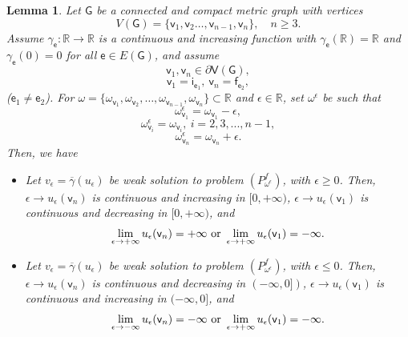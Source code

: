 \documentclass[reqno,12pt]{amsart}
\newtheorem{lemma}[theorem]{Lemma} %
\def\R{\mathbb R} %
\def\e{\mathsf{e}} 	%
\def\v{\mathsf{v}}	%
\newcommand{\vi}{\mathsf{i}} %
\newcommand{\vf}{\mathsf{f}} %
\newcommand{\G}{\mathsf{G}}	%
\newcommand{\V}{\mathsf{V}}	%
\numberwithin{equation}{section} %
\begin{document}
  
\begin{lemma}\label{lemma51822} Let  $\G$ be a connected and compact metric graph   with vertices $$V(\G) = \{ \v_1,\v_2 \ldots, \v_{n-1},\v_n \},\quad n\ge 3.$$     Assume $\gamma_\e:\mathbb{R}\to \mathbb{R}$ is a  continuous and increasing function with $\gamma_\e(\mathbb{R})=\mathbb{R}$ and $\gamma_\e(0)=0$ for all $\e \in E(\G)$, and  assume $$\v_1,\v_n\in \partial \V(\G),$$ 
$$\v_1=\vi_{\e_1},\ \v_n=\vf_{\e_2},$$
($\e_1\neq \e_2$).
For $\omega=\{\omega_{\v_1},\omega_{\v_2}, \ldots, \omega_{\v_{n-1}},\omega_{\v_n}  \} \subset \R$ and $\epsilon\in \R$,  set $\omega^\epsilon$ be such that $$\omega^\epsilon_{\v_1}=\omega_{\v_1}-\epsilon,$$ $$ \omega^\epsilon_{\v_i}=\omega_{\v_i}, \ i=2,3,...,n-1,
$$ $$\omega^\epsilon_{\v_n}=\omega_{\v_n}+\epsilon.$$ Then, we have 
 
 \begin{itemize}
 \item[\rm  (i)] Let $v_\epsilon = \overline{\gamma}(u_\epsilon)$ be weak solution to problem $(P_{\omega^\epsilon}^f)$,  with $\epsilon \ge 0$. Then, $\epsilon\to u_\epsilon(\v_n)$ is  continuous and  increasing in $[0,+\infty)$, $\epsilon\to u_\epsilon(\v_1)$ is continuous and decreasing in $[0, +\infty)$, and
 \begin{equation}\label{1557dl} 
 \begin{array}{l}\displaystyle
 \lim_{\epsilon\to+\infty}u_\epsilon(\v_n)=+\infty 
 \hbox{ or  } 
 \lim_{\epsilon\to+\infty}u_\epsilon(\v_1)=-\infty.
 \end{array}
 \end{equation}
 
\item[\rm (ii)] Let $v_\epsilon = \overline{\gamma}(u_\epsilon)$ be weak solution  to problem $(P_{\omega^\epsilon}^f)$,  with $\epsilon \le 0$. Then,
$\epsilon\to u_\epsilon(\v_n)$ is   continuous and  decreasing in $(-\infty,0])$,    $\epsilon\to u_\epsilon(\v_1)$ is   continuous and  increasing in $(-\infty,0]$,  and
 \begin{equation}\label{1557dlii} 
 \begin{array}{l}\displaystyle
 \lim_{\epsilon\to-\infty}u_\epsilon(\v_n)=-\infty 
 \hbox{ or  } 
 \lim_{\epsilon\to+\infty}u_\epsilon(\v_1)=-\infty.
 \end{array}
 \end{equation}
 \end{itemize}
\end{lemma}
\end{document}
